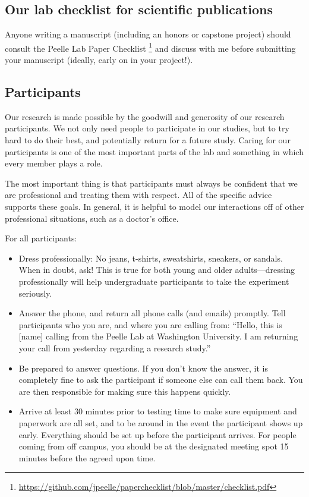 \documentclass[letterpaper,12pt,oneside]{memoir}
\begin{document}
\subsection{Our lab checklist for scientific publications}

Anyone writing a manuscript (including an honors or capstone project) should consult the Peelle Lab Paper Checklist \footnote{\url{https://github.com/jpeelle/paperchecklist/blob/master/checklist.pdf}} and discuss with me before submitting your manuscript (ideally, early on in your project!).


\subsection{Participants}
\label{sec:participants}

Our research is made possible by the goodwill and generosity of our research participants. We not only need people to participate in our studies, but to try hard to do their best, and potentially return for a future study. Caring for our participants is one of the most important parts of the lab and something in which every member plays a role.

The most important thing is that participants must always be confident that we are professional and treating them with respect. All of the specific advice supports these goals. In general, it is helpful to model our interactions off of other professional situations, such as a doctor's office.

For all participants:

\begin{itemize}

\item Dress professionally: No jeans, t-shirts, sweatshirts, sneakers, or sandals. When in doubt, ask! This is true for both young and older adults---dressing professionally will help undergraduate participants to take the experiment seriously.

\item Answer the phone, and return all phone calls (and emails) promptly. Tell participants who you are, and where you are calling from: ``Hello, this is [name] calling from the Peelle Lab at Washington University. I am returning your call from yesterday regarding a research study.''

\item Be prepared to answer questions. If you don't know the answer, it is completely fine to ask the participant if someone else can call them back. You are then responsible for making sure this happens quickly.

\item Arrive at least 30 minutes prior to testing time to make sure equipment and paperwork are all set, and to be around in the event the participant shows up early. Everything should be set up before the participant arrives. For people coming from off campus, you should be at the designated meeting spot 15 minutes before the agreed upon time.

\end{itemize}
	
\end{document}
